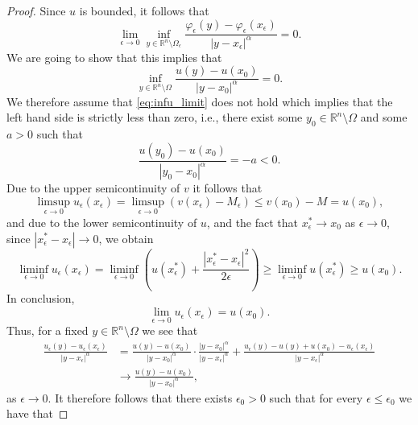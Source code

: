 \documentclass[11pt]{article}
\providecommand{\Rn}{\mathbb{R}^n}
\numberwithin{equation}{section}
\theoremstyle{definition}
\begin{document}
\begin{proof}
     Since $u$ is bounded, it follows that 
\begin{equation}
\label{eq:liminfu}
\lim_{\epsilon \to 0} \inf_{y \in \Rn \setminus \Omega_{\epsilon}} \frac{\varphi_{\epsilon}(y)-\varphi_{\epsilon}(x_{\epsilon})}{|y-x_{\epsilon}|^{\alpha}} =0.
\end{equation}
We are going to show that this implies that
\begin{equation}
\label{eq:infu_limit}
    \inf_{y \in \Rn \setminus \Omega} \frac{u(y)-u(x_0)}{|y-x_0|^{\alpha}} =0.
\end{equation}
 We therefore assume that \eqref{eq:infu_limit} does not hold which implies that the left hand side is strictly less than zero, i.e., there exist some $y_0 \in \Rn \setminus \Omega$ and some $a>0$ such that
\begin{equation*}
    \frac{u(y_0)-u(x_0)}{|y_0-x_0|^{\alpha}} = -a < 0.
\end{equation*}
Due to the upper semicontinuity of $v$ it follows that
\begin{equation*}
\limsup_{\epsilon \to 0} u_{\epsilon}(x_{\epsilon}) =\limsup_{\epsilon \to 0} (v(x_{\epsilon}) - M_{\epsilon}) \leq v(x_0) -M = u(x_0),
\end{equation*}
 and due to the lower semicontinuity of $u$, and the fact that $x_{\epsilon}^* \to x_0$ as $\epsilon \to 0$, since $|x_{\epsilon}^*-x_{\epsilon}| \to 0$, we obtain
\begin{equation*}
 \liminf_{\epsilon \to 0} u_{\epsilon}(x_{\epsilon}) =\liminf_{\epsilon \to 0} \left(u(x^*_{\epsilon}) + \frac{|x^*_{\epsilon}-x_{\epsilon}|^2}{2 \epsilon} \right)   \geq \liminf_{\epsilon \to 0} u(x_{\epsilon}^*) \geq u(x_0).
\end{equation*}
In conclusion, 
$$
\lim_{\epsilon \to 0} u_{\epsilon} (x_{ \epsilon}) = u(x_0).
$$
Thus, for a fixed $y \in \Rn \setminus \Omega$ we see that
\begin{align*}
\label{eq:pointwiseconv}
    \frac{u_{\epsilon}(y)-u_{\epsilon}(x_{\epsilon})}{|y-x_{\epsilon}|^{\alpha}} &= \frac{u(y)-u(x_0)}{|y-x_0|^{\alpha}} \cdot \frac{|y-x_0|^{\alpha}}{|y-x_{\epsilon}|^{\alpha}} + \frac{u_{\epsilon}(y)-u(y) + u(x_0)-u_{\epsilon}(x_{\epsilon})}{|y-x_{\epsilon}|^{\alpha}} \nonumber\\
    &\to \frac{u(y)-u(x_0)}{|y-x_0|^{\alpha}}, 
\end{align*}
as $\epsilon \to 0$. It therefore follows that there exists $\epsilon_0 >0$ such that for every $\epsilon \leq \epsilon_0$ we have that

\end{proof}
\end{document}
